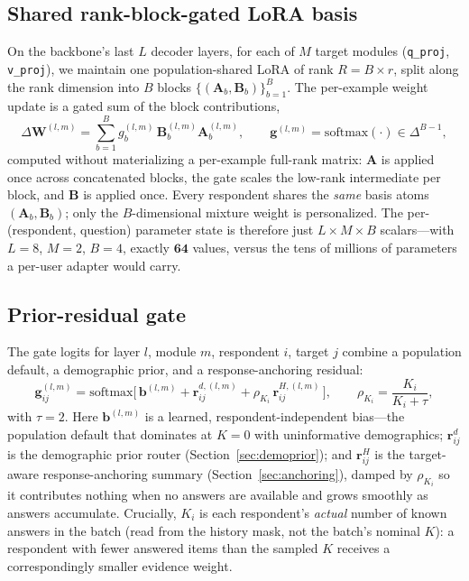 \documentclass[letterpaper]{article} %
\begin{document}
\subsection{Shared rank-block-gated LoRA basis}
On the backbone's last $L$ decoder layers, for each of $M$ target modules
(\texttt{q\_proj}, \texttt{v\_proj}), we maintain one population-shared LoRA of
rank $R=B\times r$, split along the rank dimension into $B$ blocks
$\{(\bm{A}_b, \bm{B}_b)\}_{b=1}^{B}$. The per-example weight update is a
gated sum of the block contributions,
\begin{equation}
\Delta \bm{W}^{(l,m)} = \sum_{b=1}^{B} g_b^{(l,m)}\, \bm{B}_b^{(l,m)} \bm{A}_b^{(l,m)},
\qquad \bm{g}^{(l,m)} = \mathrm{softmax}(\cdot)\in\Delta^{B-1},
\label{eq:gatedlora}
\end{equation}
computed without materializing a per-example full-rank matrix: $\bm{A}$ is
applied once across concatenated blocks, the gate scales the low-rank
intermediate per block, and $\bm{B}$ is applied once. Every respondent shares
the \emph{same} basis atoms $(\bm{A}_b, \bm{B}_b)$; only the $B$-dimensional
mixture weight is personalized. The per-(respondent, question) parameter state
is therefore just $L\times M\times B$ scalars---with $L{=}8$, $M{=}2$, $B{=}4$,
exactly $\mathbf{64}$ values, versus the tens of millions of parameters a
per-user adapter would carry.

\subsection{Prior-residual gate}
The gate logits for layer $l$, module $m$, respondent $i$, target $j$ combine
a population default, a demographic prior, and a response-anchoring residual:
\begin{equation}
\bm{g}_{ij}^{(l,m)} = \mathrm{softmax}\!\Big[\, \bm{b}^{(l,m)}
   + \bm{r}_{ij}^{d,(l,m)}
   + \rho_{K_i}\, \bm{r}_{ij}^{H,(l,m)} \,\Big],
\qquad
\rho_{K_i} = \frac{K_i}{K_i + \tau},
\label{eq:gate}
\end{equation}
with $\tau{=}2$. Here $\bm{b}^{(l,m)}$ is a learned, respondent-independent
bias---the population default that dominates at $K{=}0$ with uninformative
demographics; $\bm{r}_{ij}^{d}$ is the demographic prior router
(Section~\ref{sec:demoprior}); and $\bm{r}_{ij}^{H}$ is the target-aware
response-anchoring summary (Section~\ref{sec:anchoring}), damped by
$\rho_{K_i}$ so it contributes nothing when no answers are available and grows
smoothly as answers accumulate. Crucially, $K_i$ is each respondent's
\emph{actual} number of known answers in the batch (read from the history
mask, not the batch's nominal $K$): a respondent with fewer answered items than
the sampled $K$ receives a correspondingly smaller evidence weight.
\end{document}
